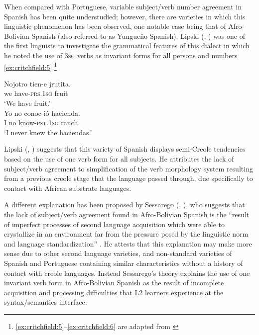 \documentclass[output=paper,colorlinks,citecolor=brown,
]{langscibook}
\begin{document}
When compared with Portuguese, variable subject/verb number agreement in Spanish has been quite understudied; however, there are varieties in which this linguistic phenomenon has been observed, one notable case being that of Afro-Bolivian Spanish (also referred to as Yungueño Spanish). Lipski (\citeyear{lipski2008a}, \citeyear{lipski2008b}) was one of the first linguists to investigate the grammatical features of this dialect in which he noted the use of \textsc{3sg} verbs as invariant forms for all persons and numbers \ref{ex:critchfield:5}.\footnote{\ref{ex:critchfield:5}--\ref{ex:critchfield:6} are adapted from \citet[107--108]{lipski2008a}}




\begin{exe} %
    \ex\label{ex:critchfield:5} 
    \begin{xlist} 
        \ex \label{ex:critchfield:5a}
            \gll Nojotro    tien-e  jrutita.\\  
                 we         have-\textsc{prs}.\textsc{1sg}   fruit\\
            \glt `We have fruit.'\\
        \ex\label{ex:critchfield:5b}
            \gll  Yo no    conoc-ió       hacienda.\\
               I   no    know-\textsc{pst}.\textsc{1sg}   ranch.\\
            \glt  `I never knew the haciendas.'
\end{xlist}
\end{exe}

Lipski (\citeyear{lipski2008a}, \citeyear{lipski2008b}) suggests that this variety of Spanish displays semi-Creole tendencies based on the use of one verb form for all subjects. He attributes the lack of subject/verb agreement to simplification of the verb morphology system resulting from a previous creole stage that the language passed through, due specifically to contact with African substrate languages. 

A different explanation has been proposed by Sessarego (\citeyear{sessarego2011status}, \citeyear{sessarego2012non}), who suggests that the lack of subject/verb agreement found in Afro-Bolivian Spanish is the ``result of imperfect processes of second language acquisition which were able to crystallize in an environment far from the pressure posed by the linguistic norm and language standardization'' \citep[126]{sessarego2011status}. He attests that this explanation may make more sense due to other second language varieties, and non-standard varieties of Spanish and Portuguese containing similar characteristics without a history of contact with creole languages. Instead Sessarego's theory explains the use of one invariant verb form in Afro-Bolivian Spanish as the result of incomplete acquisition and processing difficulties that L2 learners experience at the syntax/semantics interface.
\end{document}
